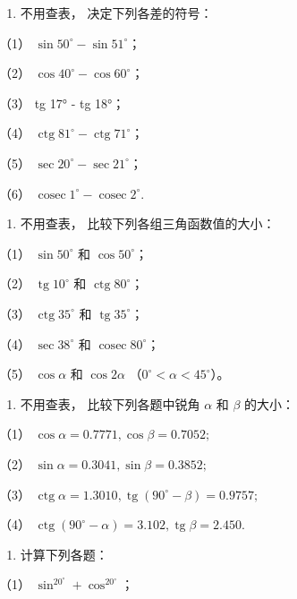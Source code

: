 \begin{enumerate}
\item
  不用查表， 决定下列各差的符号：
\end{enumerate}

（1） \(\sin 50^{\circ} - \sin 51^{\circ}\)；

（2） \(\cos 40^{\circ} - \cos 60^{\circ}\)；

（3） tg 17° - tg 18°；

（4）
\(\operatorname{ctg} 81^{\circ} - \operatorname{ctg} 71^{\circ}\)；

（5） \(\sec 20^{\circ} - \sec 21^{\circ}\)；

（6）
\(\operatorname{cosec} 1^{\circ} - \operatorname{cosec} 2^{\circ}\).

\begin{enumerate}[start=2]
\item
  不用查表， 比较下列各组三角函数值的大小：
\end{enumerate}

（1） \(\sin 50^{\circ}\) 和 \(\cos 50^{\circ}\)；

（2） \(\operatorname{tg} 10^{\circ}\) 和
\(\operatorname{ctg} 80^{\circ}\)；

（3） \(\operatorname{ctg} 35^{\circ}\) 和
\(\operatorname{tg} 35^{\circ}\)；

（4） \(\sec 38^{\circ}\) 和 \(\operatorname{cosec} 80^{\circ}\)；

（5） \(\cos \alpha\) 和 \(\cos 2\alpha\)
（\(0^{\circ} < \alpha < 45^{\circ}\)）。

\begin{enumerate}[start=3]
\item
  不用查表， 比较下列各题中锐角 \(\alpha\) 和 \(\beta\) 的大小：
\end{enumerate}

（1） \(\cos \alpha = 0.7771, \cos \beta = 0.7052;\)

（2） \(\sin \alpha = 0.3041, \sin \beta = 0.3852;\)

（3）
\(\operatorname{ctg} \alpha = 1.3010, \operatorname{tg}(90^\circ - \beta) = 0.9757;\)

（4）
\(\operatorname{ctg}(90^{\circ} - \alpha) = 3.102, \operatorname{tg}\beta = 2.450.\)

\begin{enumerate}[start=4]
\item
  计算下列各题：
\end{enumerate}

（1） \(\sin^20^\circ + \cos^20^\circ\)；

